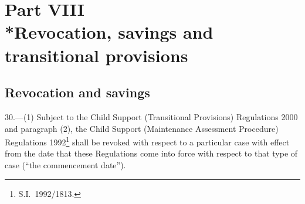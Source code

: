 \documentclass[12pt,a4paper]{article}
\begin{document}
\section[Part VIII --- Revocation, savings and transitional provisions]{Part VIII\\*Revocation, savings and transitional provisions}

\renewcommand\parthead{--- Part VIII}

\subsection[30. Revocation and savings]{Revocation and savings}

30.---(1)  Subject to 
the Child Support (Transitional Provisions) Regulations 2000 and %
paragraph (2), the Child Support (Maintenance Assessment Procedure) Regulations 1992\footnote{S.I.\ 1992/1813.} shall be revoked with respect to a particular case with effect from the date that these Regulations come into force with respect to that type of case (“the commencement date”).
\end{document}
